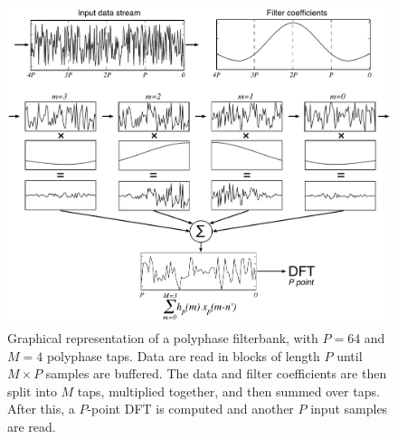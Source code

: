\documentclass{ws-rv961x669}
\begin{document}
\begin{figure}
 \centering
 \includegraphics[width=1.0\textwidth]{./figures/pfb_chart_v3}
 \caption{Graphical representation of a polyphase filterbank, with $P=64$ and $M=4$ polyphase taps. Data are read in blocks of length $P$ until $M\times P$  samples are buffered. The data and filter coefficients are then split into $M$ taps, multiplied together, and then summed over taps. After this, a $P$-point DFT is computed and another $P$ input samples are read.  \label{fig:pfb_chart}}
\end{figure}





\end{document}
